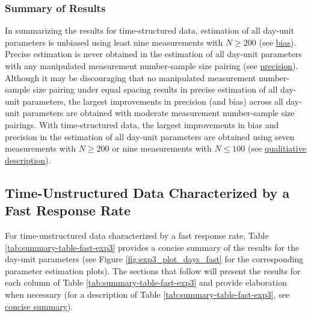 \documentclass[
12pt, %
twoside,
english]{guelphthesis}
\begin{document}
\hypertarget{summary-of-results-8}{%
\subsubsection{Summary of Results}\label{summary-of-results-8}}

In summarizing the results for time-structured data, estimation of all day-unit parameters is unbiased using least nine measurements with \(N \ge 200\) (see \protect\hyperlink{bias-time-struc-exp3}{bias}). Precise estimation is never obtained in the estimation of all day-unit parameters with any manipulated measurement number-sample size pairing (see \protect\hyperlink{precision-time-struc-exp3}{precision}). Although it may be discouraging that no manipulated measurement number-sample size pairing under equal spacing results in precise estimation of all day-unit parameters, the largest improvements in precision (and bias) across all day-unit parameters are obtained with moderate measurement number-sample size pairings. With time-structured data, the largest improvements in bias and precision in the estimation of all day-unit parameters are obtained using seven measurements with \(N \ge 200\) or nine measurements with \(N \le 100\) (see \protect\hyperlink{qualitative-time-struc-exp3}{qualitiative description}).

\hypertarget{time-unstructured-data-characterized-by-a-fast-response-rate}{%
\subsection{Time-Unstructured Data Characterized by a Fast Response Rate}\label{time-unstructured-data-characterized-by-a-fast-response-rate}}

For time-unstructured data characterized by a fast response rate, Table \ref{tab:summary-table-fast-exp3} provides a concise summary of the results for the day-unit parameters (see Figure \ref{fig:exp3_plot_days_fast} for the corresponding parameter estimation plots). The sections that follow will present the results for each column of Table \ref{tab:summary-table-fast-exp3} and provide elaboration when necessary (for a description of Table \ref{tab:summary-table-fast-exp3}, see \protect\hyperlink{concise-example-exp3}{concise summary}).
\end{document}
